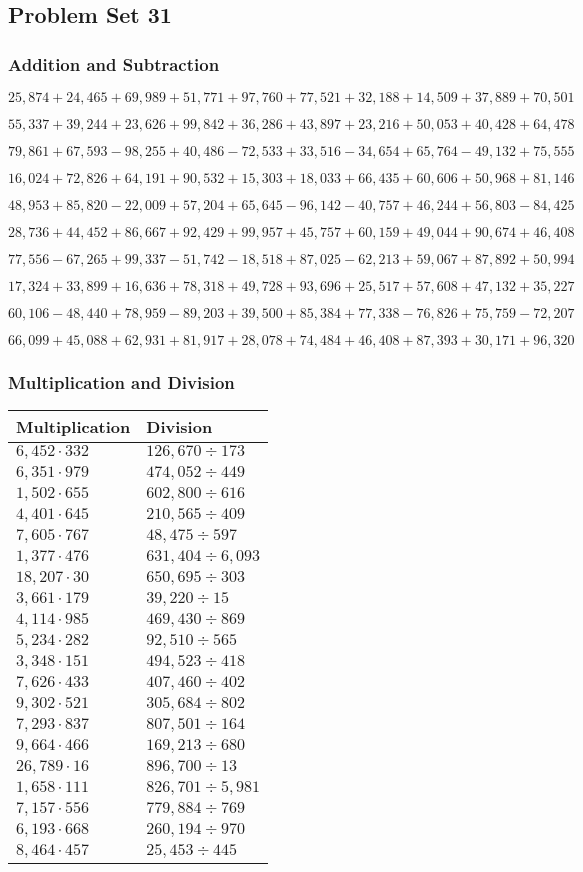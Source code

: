 \hypertarget{problem-set-31-4}{%
\subsection{Problem Set 31}\label{problem-set-31-4}}

\hypertarget{addition-and-subtraction-253}{%
\subsubsection{Addition and
Subtraction}\label{addition-and-subtraction-253}}

\(25,874+24,465+69,989+51,771+97,760+77,521+32,188+14,509+37,889+ 70,501\)

\(55,337+39,244+23,626+99,842+36,286+43,897+23,216+50,053+40,428+64,478\)

\(79,861+67,593-98,255+40,486-72,533+33,516-34,654+65,764-49,132+75,555\)

\(16,024+72,826+64,191+90,532+15,303+18,033+66,435+60,606+50,968+81,146\)

\(48,953+85,820-22,009+57,204+65,645-96,142-40,757+46,244+56,803-84,425\)

\(28,736+44,452+86,667+92,429+99,957+45,757+60,159+49,044+90,674+46,408\)

\(77,556-67,265+99,337-51,742-18,518+87,025-62,213+59,067+87,892+50,994\)

\(17,324+33,899+16,636+78,318+49,728+93,696+25,517+57,608+47,132+35,227\)

\(60,106-48,440+78,959-89,203+39,500+85,384+77,338-76,826+75,759-72,207\)

\(66,099+45,088+62,931+81,917+28,078+74,484+46,408+87,393+30,171+96,320\)

\hypertarget{multiplication-and-division-252}{%
\subsubsection{Multiplication and
Division}\label{multiplication-and-division-252}}

\begin{longtable}[]{@{}ll@{}}
\toprule
Multiplication & Division\tabularnewline
\midrule
\endhead
\(6,452\cdot332\) & \(126,670÷173\)\tabularnewline
\(6,351\cdot979\) & \(474,052÷449\)\tabularnewline
\(1,502\cdot655\) & \(602,800÷616\)\tabularnewline
\(4,401\cdot645\) & \(210,565÷409\)\tabularnewline
\(7,605\cdot767\) & \(48,475÷597\)\tabularnewline
\(1,377\cdot476\) & \(631,404÷6,093\)\tabularnewline
\(18,207\cdot30\) & \(650,695÷303\)\tabularnewline
\(3,661\cdot179\) & \(39,220÷15\)\tabularnewline
\(4,114\cdot985\) & \(469,430÷869\)\tabularnewline
\(5,234\cdot282\) & \(92,510÷565\)\tabularnewline
\(3,348\cdot151\) & \(494,523÷418\)\tabularnewline
\(7,626\cdot433\) & \(407,460÷402\)\tabularnewline
\(9,302\cdot521\) & \(305,684÷802\)\tabularnewline
\(7,293\cdot837\) & \(807,501÷164\)\tabularnewline
\(9,664\cdot466\) & \(169,213÷680\)\tabularnewline
\(26,789\cdot16\) & \(896,700÷13\)\tabularnewline
\(1,658\cdot111\) & \(826,701÷5,981\)\tabularnewline
\(7,157\cdot556\) & \(779,884÷769\)\tabularnewline
\(6,193\cdot668\) & \(260,194÷970\)\tabularnewline
\(8,464\cdot457\) & \(25,453÷445\)\tabularnewline
\bottomrule
\end{longtable}

